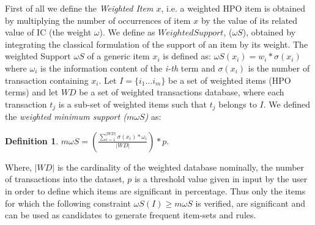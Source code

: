 \documentclass{article}
\theoremstyle{definition}
\newtheorem{definition}{Definition}[section]
\begin{document}
First of all we define the \textit{Weighted Item $x$}, i.e. a weighted HPO item is obtained by multiplying the number of occurrences of item $x$ by the value of its related value of IC (the weight $\omega$). We define as $Weighted Support$, ($\omega S$), obtained by integrating  the classical formulation of the support of an item by its weight. The weighted Support \textit{$\omega S$} of a generic item $x_i$ is defined as: $\omega S(x_i)=w_i*\sigma(x_i)$ where $\omega _i$ is the information content of the \textit{i-th} term and $\sigma(x_i)$ is the number of transaction containing $x_i$. Let $I=\{i_1 \ldots i_m\}$ be a set of weighted items (HPO terms) and let $WD$ be a set of weighted transactions database, where each transaction $t_j$ is a sub-set of weighted items such that $t_j$ belongs to $I$. %
 We defined the \textit{weighted minimum support ($m\omega S$)} as:\\
\begin{definition}
\centering	
$m\omega S =  \left(\frac{\sum_{i=1}^{|WD|} \sigma(x_i)*\omega_i} {|WD|}\right)*p$.
 \end{definition}
 Where, $|WD|$ is the cardinality of the weighted database nominally, the number of transactions into the dataset, $p$ is a threshold value given in input by the user in order to define which items are significant in percentage.  Thus only the items for which the following constraint $\omega S(I) \geq m\omega S$ is verified, are significant and can be used as candidates to generate frequent item-sets and rules.
\end{document}
